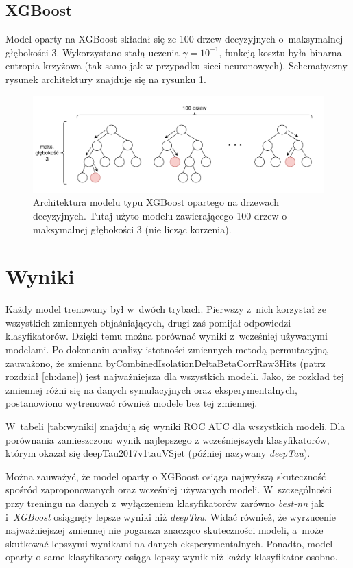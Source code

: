 \documentclass{pracalicmgr}
\begin{document}
	
	\section{XGBoost}
	Model oparty na XGBoost składał się ze 100 drzew decyzyjnych o~maksymalnej głębokości 3. Wykorzystano stałą uczenia $\gamma = 10^{-1}$, funkcją kosztu była binarna entropia krzyżowa (tak samo jak w przypadku sieci neuronowych). Schematyczny rysunek architektury znajduje się na rysunku \ref{fig:xgb}.
	
	\begin{figure}[H]
	\centering
	\includegraphics[width=1.0\textwidth]{xgb.pdf}
	\caption{Architektura modelu typu XGBoost opartego na drzewach decyzyjnych. Tutaj użyto modelu zawierającego 100 drzew o maksymalnej głębokości 3 (nie licząc korzenia).}
	\label{fig:xgb}
	\end{figure}
    
    \chapter{Wyniki}
    Każdy model trenowany był w~dwóch trybach. Pierwszy z~nich korzystał ze wszystkich zmiennych objaśniających, drugi zaś pomijał odpowiedzi klasyfikatorów. Dzięki temu można porównać wyniki z~wcześniej używanymi modelami. Po dokonaniu analizy istotności zmiennych metodą permutacyjną zauważono, że zmienna byCombinedIsolationDeltaBetaCorrRaw3Hits (patrz rozdział \ref{ch:dane}) jest najważniejsza dla wszystkich modeli. Jako, że rozkład tej zmiennej różni się na danych symulacyjnych oraz eksperymentalnych, postanowiono wytrenować również modele bez tej zmiennej.
    
	W~tabeli \ref{tab:wyniki} znajdują się wyniki ROC AUC dla wszystkich modeli. Dla porównania zamieszczono wynik najlepszego z wcześniejszych klasyfikatorów, którym okazał się deepTau2017v1tauVSjet (później nazywany \textit{deepTau}). 
	
	Można zauważyć, że model oparty o XGBoost osiąga najwyższą skuteczność spośród zaproponowanych oraz wcześniej używanych modeli. W~szczególności przy treningu na danych z~wyłączeniem klasyfikatorów zarówno \textit{best-nn} jak i~\textit{XGBoost} osiągnęły lepsze wyniki niż \textit{deepTau}. Widać również, że wyrzucenie najważniejszej zmiennej nie pogarsza znacząco skuteczności modeli, a~może skutkować lepszymi wynikami na danych eksperymentalnych. Ponadto, model oparty o same klasyfikatory osiąga lepszy wynik niż każdy klasyfikator osobno.
	
\end{document}
